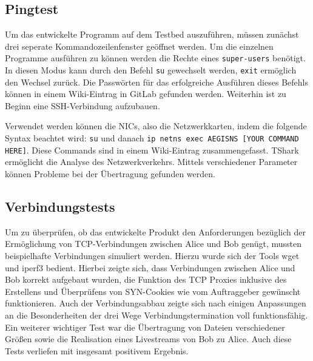 \documentclass[../review_3.tex]{subfiles}
\begin{document}
\subsection{Pingtest}

Um das entwickelte Programm auf dem Testbed auszuführen, müssen zunächst drei seperate Kommandozeilenfenster geöffnet werden. Um die einzelnen Programme ausführen zu können werden die Rechte eines \texttt{super-users} benötigt. In diesen Modus kann durch den Befehl \texttt{su} gewechselt werden, \texttt{exit} ermöglich den Wechsel zurück. Die Passwörten für das erfolgreiche Ausführen dieses Befehls können in einem Wiki-Eintrag in GitLab gefunden werden. Weiterhin ist zu Beginn eine SSH-Verbindung aufzubauen.

Verwendet werden können die NICs, also die Netzwerkkarten, indem die folgende Syntax beachtet wird: \texttt{su} und danach \texttt{ip netns exec AEGISNS [YOUR COMMAND HERE]}. Diese Commands sind in einem Wiki-Eintrag zusammengefasst. TShark ermöglicht die Analyse des Netzwerkverkehrs. Mittels verschiedener Parameter können Probleme bei der Übertragung gefunden werden.

\subsection{Verbindungstests}

Um zu überprüfen, ob das entwickelte Produkt den Anforderungen bezüglich der Ermöglichung von TCP-Verbindungen zwischen Alice und Bob genügt, mussten beispielhafte Verbindungen simuliert werden. Hierzu wurde sich der Tools wget und iperf3 bedient. Hierbei zeigte sich, dass Verbindungen zwischen Alice und Bob korrekt aufgebaut wurden, die Funktion des TCP Proxies inklusive des Erstellens und Überprüfens von SYN-Cookies wie vom Auftraggeber gewünscht funktionieren. Auch der Verbindungsabbau zeigte sich nach einigen Anpassungen an die Besonderheiten der drei Wege Verbindungstermination voll funktionsfähig. Ein weiterer wichtiger Test war die Übertragung von Dateien verschiedener Größen sowie die Realisation eines Livestreams von Bob zu Alice. Auch diese Tests verliefen mit insgesamt positivem Ergebnis.
\end{document}
